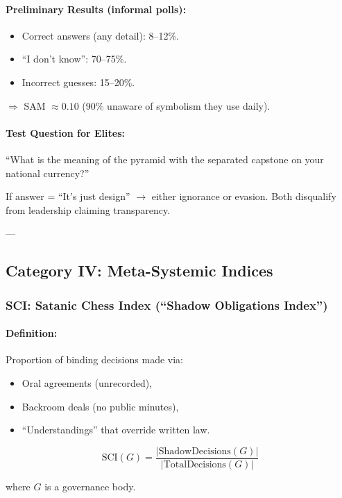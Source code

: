 \documentclass[11pt,a4paper]{article}
\theoremstyle{definition}
\theoremstyle{remark}
\begin{document}
\paragraph{Preliminary Results (informal polls):}
\begin{itemize}
\item Correct answers (any detail): 8–12\%.
\item ``I don't know'': 70–75\%.
\item Incorrect guesses: 15–20\%.
\end{itemize}

$\Rightarrow$ SAM $\approx 0.10$ (90\% unaware of symbolism they use daily).

\paragraph{Test Question for Elites:}
``What is the meaning of the pyramid with the separated capstone on your national currency?''

If answer = ``It's just design'' $\rightarrow$ either ignorance or evasion. Both disqualify from leadership claiming transparency.

---

\subsection{Category IV: Meta-Systemic Indices}

\subsubsection{SCI: Satanic Chess Index (``Shadow Obligations Index'')}

\paragraph{Definition:}
Proportion of binding decisions made via:
\begin{itemize}
\item Oral agreements (unrecorded),
\item Backroom deals (no public minutes),
\item ``Understandings'' that override written law.
\end{itemize}

\[
\text{SCI}(G) = \frac{|\text{ShadowDecisions}(G)|}{|\text{TotalDecisions}(G)|}
\]

where $G$ is a governance body.
\end{document}

